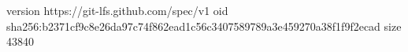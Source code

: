 version https://git-lfs.github.com/spec/v1
oid sha256:b2371cf9c8e26da97c74f862ead1c56c3407589789a3e459270a38f1f9f2ecad
size 43840
